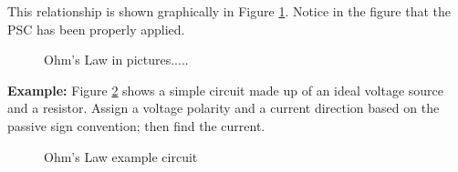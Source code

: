 \documentclass{handout}
\begin{document}

This relationship is shown graphically in Figure \ref{fig: Ohms_law}.  Notice in the figure that the PSC has been properly applied.

\begin{figure}
\centering
{}
\caption{Ohm's Law in pictures.....}
\label{fig: Ohms_law}
\end{figure}

\textbf{Example:}  Figure \ref{fig: OhmsLawExample} shows a simple circuit made up of an ideal voltage source and a resistor.  Assign a voltage polarity and a current direction based on the passive sign convention; then find the current.

\begin{figure}
\centering
{}
\caption{Ohm's Law example circuit}
\label{fig: OhmsLawExample}
\end{figure}

\end{document}
